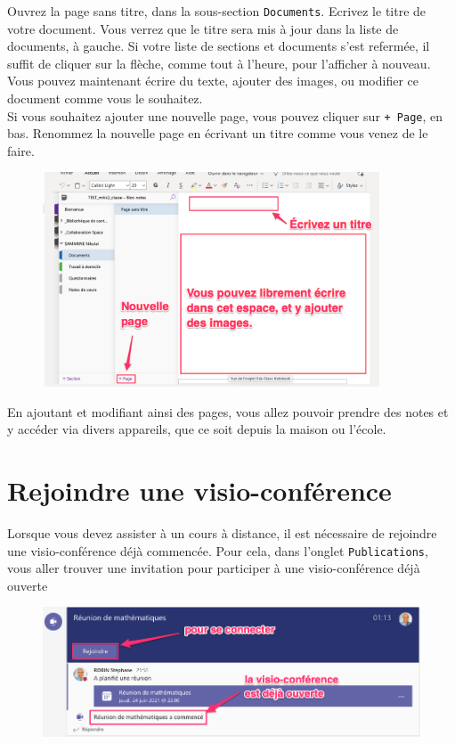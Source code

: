 Ouvrez la page sans titre, dans la sous-section \texttt{Documents}. Ecrivez le titre de votre document. Vous verrez que le titre sera mis à jour dans la liste de documents, à gauche. Si votre liste de sections et documents s'est refermée, il suffit de cliquer sur la flèche, comme tout à l'heure, pour l'afficher à nouveau.\\

Vous pouvez maintenant écrire du texte, ajouter des images, ou modifier ce document comme vous le souhaitez.\\

Si vous souhaitez ajouter une nouvelle page, vous pouvez cliquer sur \texttt{+ Page}, en bas. Renommez la nouvelle page en écrivant un titre comme vous venez de le faire.

\begin{figure}[H]
	\includegraphics[width=10cm]{./images/teams/sous_section_documents_crop}
	\centering
\end{figure}

En ajoutant et modifiant ainsi des pages, vous allez pouvoir prendre des notes et y accéder via divers appareils, que ce soit depuis la maison ou l'école.

\section{Rejoindre une visio-conférence}

Lorsque vous devez assister à un cours à distance, il est nécessaire de rejoindre une visio-conférence déjà commencée. Pour cela, dans l'onglet \texttt{Publications}, vous aller trouver une invitation pour participer à une visio-conférence déjà ouverte

\begin{figure}[H]
\includegraphics[width=12cm]{./images/teams/video3.png}
\centering
\end{figure}

